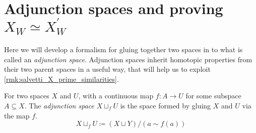 \documentclass[class=article, crop=false]{standalone}
\begin{document}
\section{Adjunction spaces and proving \texorpdfstring{$X_W \simeq X^\prime_W$}{X W homotopy equiv. to X prime W}}
\label{sec:adj_hom_equiv}

Here we will develop a formalism for gluing together two spaces in to what is called an \emph{adjunction space}. Adjunction spaces inherit homotopic properties from their two parent spaces in a useful way, that will help us to exploit \cref{rmk:salvetti_X_prime_similarities}.

\begin{definition}
    For two spaces $X$ and $U$, with a continuous map $f \colon A \to U$ for some subspace $A \subseteq X$. The \emph{adjunction space} $ X \sqcup_f U$  is the space formed by gluing $X$ and $U$ via the map $f$.
    \begin{equation*}
        X \sqcup_f U \coloneq (X \sqcup Y)/(a \sim f(a))
    \end{equation*}
\end{definition}
\end{document}
